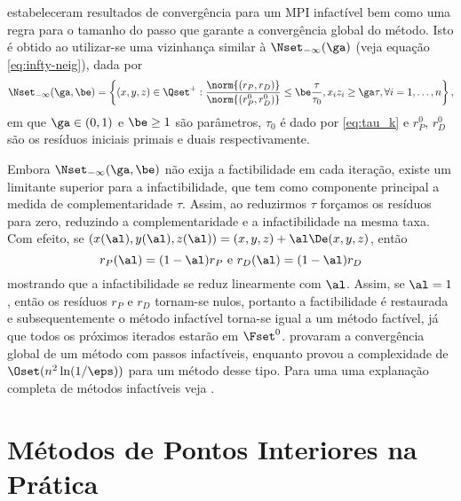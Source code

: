 \citet{Kojima:1993fe}
estabeleceram resultados de convergência para um \ac{MPI} infactível bem como uma regra para o
tamanho do passo que garante a convergência global do método. Isto é obtido ao
utilizar-se uma vizinhança similar à $\Nset_{-\infty}(\ga)$ (veja equação \eqref{eq:infty-neig}), dada por 
\begin{equation}
\label{eq:infeasible-infty-neig}
\Nset_{-\infty}(\ga,\be) = \left\{(x,y,z) \in\Qset^+ :\frac{\norm{(r_P,r_D)}}{\norm{(r^0_P,r^0_D)}} \leq
\be\frac{\tau}{\tau_0}, 
x_iz_i\geq \ga\tau,\forall i =1,\dotsc,n \right\}, 
\end{equation}
em que $\ga \in(0,1)$ e $\be\geq 1$ são
parâmetros, $\tau_0$ é dado por \eqref{eq:tau_k} e  $r^0_P$, $r^0_D$ são os
resíduos iniciais primais e duais respectivamente.

 
Embora $\Nset_{-\infty}(\ga,\be)$ não exija a factibilidade em cada iteração,
 existe um limitante superior para a infactibilidade,  que tem como
componente principal a medida de  complementaridade $\tau$.
Assim, ao reduzirmos $\tau$ forçamos os resíduos para zero,  reduzindo
a complementaridade e a infactibilidade na mesma taxa. Com efeito, se
$(x(\al),y(\al),z(\al)) = (x,y,z) + \al\De(x,y,z)$, então 
\[
r_P(\al) = (1-\al)r_P \text{ e } 
r_D(\al) = (1-\al)r_D
\]
mostrando que a infactibilidade se reduz linearmente com $\al$.  Assim, se $\al
= 1$, então os resíduos $r_P$ e $r_D$ tornam-se nulos, portanto a factibilidade é
restaurada e  subsequentemente o método infactível torna-se igual a um método
factível, já que todos os próximos iterados estarão em $\Fset^0$.
\citet{Kojima:1993fe} provaram a convergência global de um método com passos
infactíveis, enquanto \citet{Zhang:2006ic} provou  a complexidade  de $\Oset(
n^2 \ln ( 1/\eps ) )$ para um método desse tipo. Para uma uma explanação
completa de métodos infactíveis veja \citet[cap. 6]{Wright:Primal-dual-interior-point:1997h}. 



 
 

 


\section{Métodos de Pontos Interiores na Prática}

